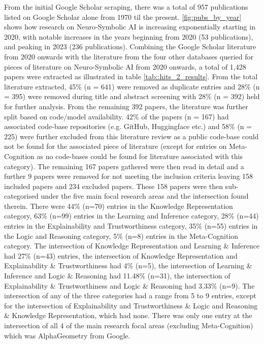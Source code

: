 \documentclass[hf]{ceurart}
\begin{document}
From the initial Google Scholar scraping, there was a total of 957 publications listed on Google Scholar alone from 1970 til the present. \autoref{fig:pubs_by_year} shows how research on Neuro-Symbolic AI is increasing exponentially starting in 2020, with notable increases in the years beginning from 2020 (53 publications), and peaking in 2023 (236 publications). Combining the Google Scholar literature from 2020 onwards with the literature from the four other databases queried for pieces of literature on Neuro-Symbolic AI from 2020 onwards, a total of 1,428 papers were extracted as illustrated in table \ref{tab::hits_2_results}. From the total literature extracted, 45\% (n = 641) were removed as duplicate entries and 28\% (n = 395) were removed during title and abstract screening with 28\% (n = 392) held for further analysis. From the remaining 392 papers, the literature was further split based on code/model availability. 42\% of the papers (n = 167) had associated code-base repositories (e.g. GitHub, Huggingface etc.) and 58\% (n = 225) were further excluded from this literature review as a public code-base could not be found for the associated piece of literature (except for entries on Meta-Cognition as no code-bases could be found for literature associated with this category). The remaining 167 papers gathered were then read in detail and a further 9 papers were removed for not meeting the inclusion criteria leaving 158 included papers and 234 excluded papers. These 158 papers were then sub-categorised under the five main focal research areas and the intersection found therein. There were 44\% (n=70) entries in the Knowledge Representation category, 63\% (n=99) entries in the Learning and Inference category, 28\% (n=44) entries in the Explainability and Trustworthiness category, 35\% (n=55) entries in the Logic and Reasoning category, 5\% (n=8) entries in the Meta-Cognition category. The intersection of Knowledge Representation and Learning \& Inference had 27\% (n=43) entries, the intersection of Knowledge Representation and Explainability \& Trustworthiness had 4\% (n=5), the intersection of Learning \& Inference and Logic \& Reasoning had 11.48\% (n=31), the intersection of Explainability \& Trustworthiness and Logic \& Reasoning had 3.33\% (n=9). The intersection of any of the three categories had a range from 5 to 9 entries, except for the intersection of Explainability and Trustworthiness \& Logic and Reasoning \& Knowledge Representation, which had none. There was only one entry at the intersection of all 4 of the main research focal areas (excluding Meta-Cognition) which was AlphaGeometry from Google\cite{Trinh2024}. 
\end{document}
